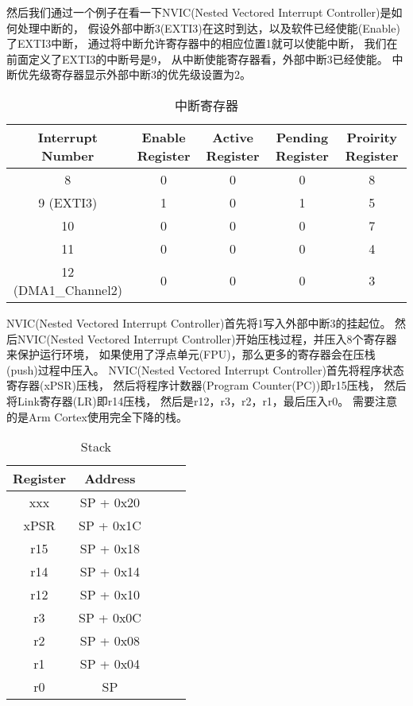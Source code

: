 然后我们通过一个例子在看一下NVIC(Nested Vectored Interrupt Controller)是如何处理中断的，
假设外部中断3(EXTI3)在这时到达，以及软件已经使能(Enable)了EXTI3中断，
通过将中断允许寄存器中的相应位置1就可以使能中断，
我们在前面定义了EXTI3的中断号是9，
从中断使能寄存器看，外部中断3已经使能。
中断优先级寄存器显示外部中断3的优先级设置为2。
\begin{table}[htbp]
    \caption{  中断寄存器 }\label{tab:table1}
    \vspace{0.5em}\centering\wuhao
    \begin{tabular}{ccccc}
    \toprule[1.5pt]
    Interrupt Number & Enable Register & Active Register & Pending Register & Proirity Register \\
    \midrule[1pt]
    8 & 0 & 0 & 0 & 8 \\
    9 (EXTI3) & 1 & 0 & 1 & 5 \\
    10 & 0 & 0 & 0 & 7 \\
    11 & 0 & 0 & 0 & 4 \\
    12 (DMA1\_Channel2) & 0 & 0 & 0 & 3 \\
    \bottomrule[1.5pt]
    \end{tabular}
    \vspace{\baselineskip}
    \end{table}

NVIC(Nested Vectored Interrupt Controller)首先将1写入外部中断3的挂起位。
然后NVIC(Nested Vectored Interrupt Controller)开始压栈过程，并压入8个寄存器来保护运行环境，
如果使用了浮点单元(FPU)，那么更多的寄存器会在压栈(push)过程中压入。
NVIC(Nested Vectored Interrupt Controller)首先将程序状态寄存器(xPSR)压栈，
然后将程序计数器(Program Counter(PC))即r15压栈，
然后将Link寄存器(LR)即r14压栈，
然后是r12，r3，r2，r1，最后压入r0。
需要注意的是Arm Cortex使用完全下降的栈。
\begin{table}[htbp]
    \caption{  Stack }\label{tab:table1}
    \vspace{0.5em}\centering\wuhao
    \begin{tabular}{ccccc}
    \toprule[1.5pt]
    Register & Address  \\
    \midrule[1pt]
    xxx &   SP + 0x20  \\
    xPSR &  SP + 0x1C  \\
    r15 &   SP + 0x18  \\
    r14 &   SP + 0x14  \\
    r12 &   SP + 0x10  \\
    r3 &    SP + 0x0C  \\
    r2 &    SP + 0x08 \\
    r1 &    SP + 0x04  \\
    r0 &    SP  \\
    \bottomrule[1.5pt]
    \end{tabular}
    \vspace{\baselineskip}
    \end{table}

